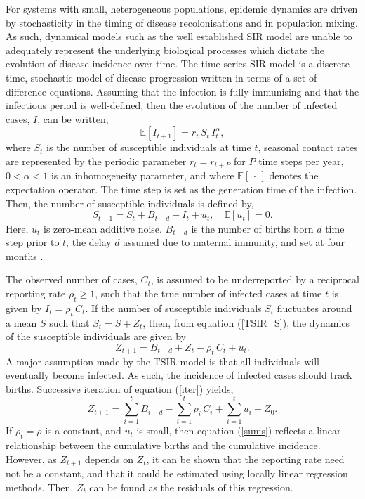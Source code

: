 \documentclass[10pt]{article}
\begin{document}
For systems with small, heterogeneous populations, epidemic dynamics are driven by stochasticity in the timing of disease recolonisations and in population mixing. As such, dynamical models such as the well established SIR model are unable to adequately represent the underlying biological processes which dictate the evolution of disease incidence over time. The time-series SIR model \cite{Finkenstadt2000} is a discrete-time, stochastic model of disease progression written in terms of a set of difference equations. Assuming that the infection is fully immunising and that the infectious period is well-defined, then the evolution of the number of infected cases, $I$, can be written,
\begin{equation}
\mathbb{E}\left[I_{t+1}\right] = r_t \, S_t \, I_t^\alpha,
\label{TSIR_I}
\end{equation}
where $S_t$ is the number of susceptible individuals at time $t$, seasonal contact rates are represented by the periodic parameter $r_t = r_{t+P}$ for $P$ time steps per year, $0 < \alpha < 1$ is an inhomogeneity parameter, and where $\mathbb{E}\left[\,\cdot\,\right]$ denotes the expectation operator. The time step is set as the generation time of the infection. Then, the number of susceptible individuals is defined by,
\begin{equation}
S_{t+1} = S_t + B_{t-d} - I_t + u_t, \quad \mathbb{E}\left[u_t\right] = 0.
\label{TSIR_S}
\end{equation}
Here, $u_t$ is  zero-mean additive noise. $B_{t-d}$ is the number of births born $d$ time step prior to $t$, the delay $d$ assumed due to maternal immunity, and set at four months \cite{Anderson1991}.

The observed number of cases, $C_t$, is assumed to be underreported by a reciprocal reporting rate $\rho_t \ge 1$, such that the true number of infected cases at time $t$ is given by $I_t = \rho_t \,C_t$. If the number of susceptible individuals $S_t$ fluctuates around a mean $\bar{S}$ such that $S_t = \bar{S} + Z_t$, then, from equation (\ref{TSIR_S}), the dynamics of the susceptible individuals are given by
\begin{equation}
Z_{t+1} = B_{t-d} + Z_{t} - \rho_t\,C_t + u_t.
\label{iter}
\end{equation}
A major assumption made by the TSIR model is that all individuals will eventually become infected. As such, the incidence of infected cases should track births. Successive iteration of equation (\ref{iter}) yields,
\begin{equation}
Z_{t+1} = \sum_{i=1}^t B_{i-d} - \sum_{i=1}^t \rho_i \, C_i + \sum_{i=1}^t u_i + Z_0.
\label{sums}
\end{equation}
If $\rho_t = \rho$ is a constant, and $u_t$ is small, then equation (\ref{sums}) reflects a linear relationship between the cumulative births and the cumulative incidence. However, as $Z_{t+1}$ depends on $Z_t$, it can be shown that the reporting rate need not be a constant, and that it could be estimated using locally linear regression methods. Then, $Z_t$ can be found as the residuals of this regression. 
\end{document}
